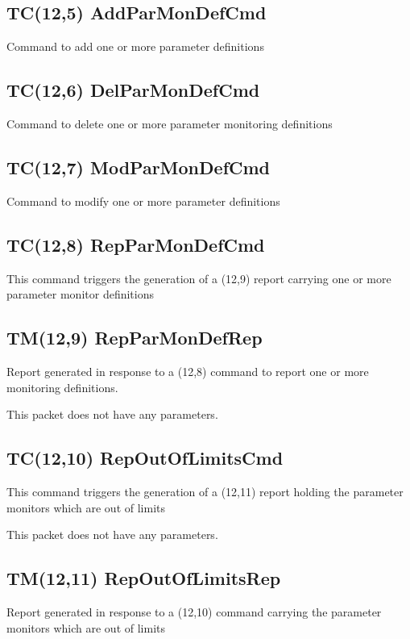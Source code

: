 \pagebreak
\subsection{TC(12,5) AddParMonDefCmd}
Command to add one or more parameter definitions

\pagebreak
\subsection{TC(12,6) DelParMonDefCmd}
Command to delete one or more parameter monitoring definitions

\pagebreak
\subsection{TC(12,7) ModParMonDefCmd}
Command to modify one or more parameter definitions

\pagebreak
\subsection{TC(12,8) RepParMonDefCmd}
This command triggers the generation of a (12,9) report carrying one or more parameter monitor definitions

\pagebreak
\subsection{TM(12,9) RepParMonDefRep}
Report generated in response to a (12,8) command to report one or more monitoring definitions.

This packet does not have any parameters.

\pagebreak
\subsection{TC(12,10) RepOutOfLimitsCmd}
This command triggers the generation of a (12,11) report holding the parameter monitors which are out of limits

This packet does not have any parameters.

\pagebreak
\subsection{TM(12,11) RepOutOfLimitsRep}
Report generated in response to a (12,10) command carrying the parameter monitors which are out of limits


